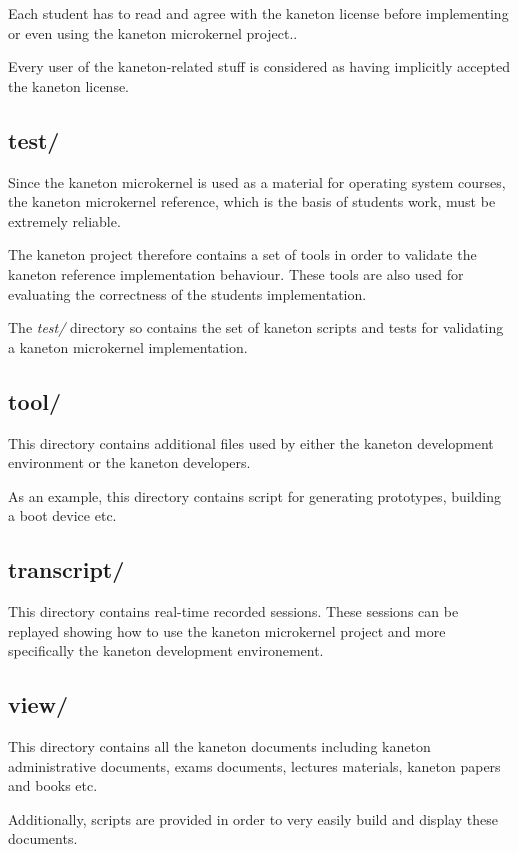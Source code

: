 Each student has to read and agree with the kaneton license before
implementing or even using the kaneton microkernel project..

Every user of the kaneton-related stuff is considered as having implicitly
accepted the kaneton license.

%
%

\subsection*{test/}

Since the kaneton microkernel is used as a material for operating system
courses, the kaneton microkernel reference, which is the basis of students
work, must be extremely reliable.

The kaneton project therefore contains a set of tools in order to validate
the kaneton reference implementation behaviour. These tools are also used
for evaluating the correctness of the students implementation.

The \textit{test/} directory so contains the set of kaneton scripts and tests
for validating a kaneton microkernel implementation.

%
%

\subsection*{tool/}

This directory contains additional files used by either the kaneton development
environment or the kaneton developers.

As an example, this directory contains script for generating prototypes,
building a boot device etc.

%
%

\subsection*{transcript/}

This directory contains real-time recorded sessions. These sessions can be
replayed showing how to use the kaneton microkernel project and more
specifically the kaneton development environement.

%
%

\subsection*{view/}

This directory contains all the kaneton documents including kaneton
administrative documents, exams documents, lectures materials, kaneton papers
and books etc.

Additionally, scripts are provided in order to very easily build and
display these documents.
